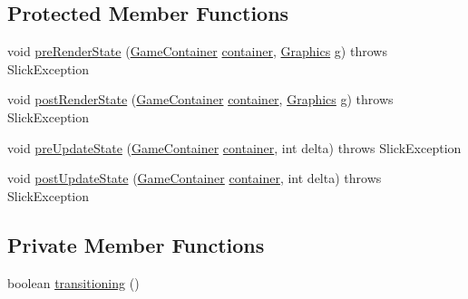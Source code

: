 \subsection*{Protected Member Functions}
\begin{DoxyCompactItemize}
\item 
void \mbox{\hyperlink{classorg_1_1newdawn_1_1slick_1_1state_1_1_state_based_game_aaf3bf464c31e3f420c1f152e36518670}{pre\+Render\+State}} (\mbox{\hyperlink{classorg_1_1newdawn_1_1slick_1_1_game_container}{Game\+Container}} \mbox{\hyperlink{classorg_1_1newdawn_1_1slick_1_1state_1_1_state_based_game_a538846600436175cbed48450adfdd025}{container}}, \mbox{\hyperlink{classorg_1_1newdawn_1_1slick_1_1_graphics}{Graphics}} g)  throws Slick\+Exception 
\item 
void \mbox{\hyperlink{classorg_1_1newdawn_1_1slick_1_1state_1_1_state_based_game_af5ecc0b6b725fb12bfe005e6310a9bc3}{post\+Render\+State}} (\mbox{\hyperlink{classorg_1_1newdawn_1_1slick_1_1_game_container}{Game\+Container}} \mbox{\hyperlink{classorg_1_1newdawn_1_1slick_1_1state_1_1_state_based_game_a538846600436175cbed48450adfdd025}{container}}, \mbox{\hyperlink{classorg_1_1newdawn_1_1slick_1_1_graphics}{Graphics}} g)  throws Slick\+Exception 
\item 
void \mbox{\hyperlink{classorg_1_1newdawn_1_1slick_1_1state_1_1_state_based_game_a3f40bf2b6e69b3c00b2aecd0b5bbcb19}{pre\+Update\+State}} (\mbox{\hyperlink{classorg_1_1newdawn_1_1slick_1_1_game_container}{Game\+Container}} \mbox{\hyperlink{classorg_1_1newdawn_1_1slick_1_1state_1_1_state_based_game_a538846600436175cbed48450adfdd025}{container}}, int delta)  throws Slick\+Exception 
\item 
void \mbox{\hyperlink{classorg_1_1newdawn_1_1slick_1_1state_1_1_state_based_game_a7f41471f0544be67c5a747998c3b2910}{post\+Update\+State}} (\mbox{\hyperlink{classorg_1_1newdawn_1_1slick_1_1_game_container}{Game\+Container}} \mbox{\hyperlink{classorg_1_1newdawn_1_1slick_1_1state_1_1_state_based_game_a538846600436175cbed48450adfdd025}{container}}, int delta)  throws Slick\+Exception 
\end{DoxyCompactItemize}
\subsection*{Private Member Functions}
\begin{DoxyCompactItemize}
\item 
boolean \mbox{\hyperlink{classorg_1_1newdawn_1_1slick_1_1state_1_1_state_based_game_ae869c08778875776081935a090d4c92f}{transitioning}} ()
\end{DoxyCompactItemize}
